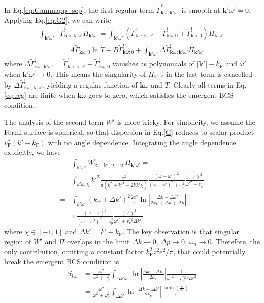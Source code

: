 \documentclass[%
 reprint,
superscriptaddress,
 amsmath,amssymb,
 aps,
prx,
]{revtex4-2}
\newcommand{\bk}{\mathbf{k}}
\newcommand{\Gammapp}{\tilde{\Gamma}}
\newcommand{\txe}{\text{e}}
\newcommand{\txr}{\text{r}}
\newcommand{\txs}{\text{s}}
\newcommand{\txF}{\text{F}}
\begin{document}
\begin{appendices}
In Eq.\eqref{eq:Gammapp_sep}, the first regular term $\Gammapp^\txr_{\bk^{}\omega^{};\bk'\omega'}$ is smooth at $\bk'\omega' = 0$. Applying Eq.\eqref{eq:G2}, we can write
\begin{align}
	\int_{\bk'\omega'}&\Gammapp^{\txr}_{\bk^{}\omega^{};\bk'\omega'}\Pi_{\bk'\omega'}=\int_{\bk'\omega'}\left(\Gammapp^{\txr}_{\bk^{}\omega^{};\bk'\omega'} - \Gammapp^{\txr}_{\bk\omega;0} +\Gammapp^{\txr}_{\bk\omega;0} \right)\Pi_{\bk'\omega'} \nonumber\\
	&=A\Gammapp^{\txr}_{\bk\omega;0}\ln T + B\Gammapp^{\txr}_{\bk\omega;0} + \int_{\bk'\omega'} \Delta\Gammapp^{\txr}_{\bk^{}\omega^{};\bk'\omega'}\Pi_{\bk'\omega'}
 \label{eq:reg}
\end{align}
where $\Delta\Gammapp^{\txr}_{\bk^{}\omega^{};\bk'\omega'} = \Gammapp^{\txr}_{\bk^{}\omega^{};\bk'\omega'}-\Gammapp^{\txr}_{\bk\omega;0}$ vanishes as polynomials of $|\bk'|-k_\txF$ and $\omega'$ when $\bk'\omega'\rightarrow 0$. This means the singularity of $\Pi_{\bk'\omega'}$ in the last term is cancelled by $\Delta\Gammapp^{\txr}_{\bk^{}\omega^{};\bk'\omega'}$, yielding a regular function of $\bk\omega$ and $T$. Clearly all terms in Eq.\eqref{eq:reg} are finite when $\bk\omega$ goes to zero, which satisfies the emergent BCS condition. 

The analysis of the second term $W^\txs$ is more tricky. For simplicity, we assume the Fermi surface is spherical, so that dispersion in Eq.\eqref{G} reduces to scalar product $v_\txF^*(k'-k_\txF)$ with no angle dependence. Integrating the angle dependence explicitly, we have
\begin{align}
  &\int_{\bk'\omega'}W^{\txs}_{\bk^{}-\bk', \omega-\omega'}\Pi_{\bk'\omega'} \nonumber =\nonumber\\ 
    &\int _{k'\omega,\chi} k'^2\frac{e^2}{\pi(k^2 +k'^2 - 2k^{}k' \chi)} \frac{(\omega - \omega')^2}{(\omega - \omega')^2+\omega_p^2} \frac{(z^\txe)^2}{\omega'^2 + \epsilon_{k'}^2}\nonumber \\
    = &\int_{k'\omega'} (k_\txF+\Delta k')^2 \frac{2 e^2}{\pi} \ln\left| \frac{\Delta k-\Delta k'}{2k_\txF + \Delta k+ \Delta p}\right| \nonumber\\
    &\times \frac{(\omega - \omega)^2}{(\omega - \omega')^2+\omega_p^2}\frac{(z^{\txe})^2}{\omega'^2 + v_\txF^{*2}\Delta k'^2}
\end{align}
where $\chi \in [-1, 1]$ and $\Delta k' = k'-k_\txF$.  The key observation is that 
singular region of $W^\txs$ and $\Pi$ overlaps in the limit $\Delta k\rightarrow 0$, $\Delta p \rightarrow 0$, $\omega_n \rightarrow 0$. Therefore, the only contribution, omitting a constant factor $k_\txF^2 z^{2} e^2/ \pi$, that could potentially break the emergent BCS condition is
\begin{align}
S_{k\omega}&= \frac{ \omega^2}{\omega^2+\omega_p^2} \int_{\Delta k'\omega'} \ln\left|\frac{\Delta k-\Delta k'}{2k_\txF}\right| \frac{1}{\omega'^2 + v_\txF^{*2} \Delta k'^2} \nonumber\\
&= \frac{ \omega^2}{\omega^2+\omega_p^2}\int_{\Delta k'} \ln\left|\frac{\Delta k-\Delta k'}{2k_\txF}\right| \frac{\tanh(\frac{\epsilon}{2T})}{\epsilon}
\label{eq:regular}	
\end{align}



\end{appendices}
\end{document}
